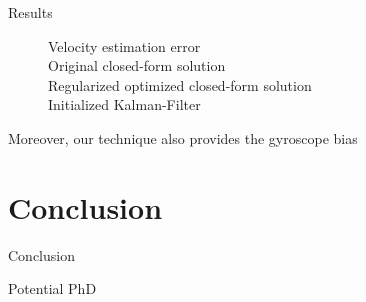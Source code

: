 \documentclass{beamer}
\begin{document}
\begin{frame}{Results}
  \begin{figure}[h!]
    \centering
    \resizebox{0.5\textwidth}{!}{}
    \caption{Velocity estimation error\\
      Original closed-form solution\\
      Regularized optimized closed-form solution\\
      Initialized Kalman-Filter}
  \end{figure}

  Moreover, our technique also provides the gyroscope bias

\end{frame}

\section{Conclusion}

\begin{frame}{Conclusion}

\end{frame}

\begin{frame}{Potential PhD}
\end{frame}


\end{document}
